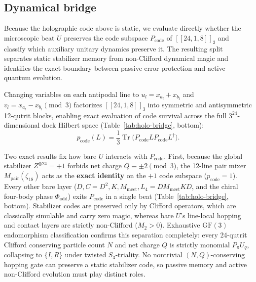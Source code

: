 \subsection{Dynamical bridge}
\label{sec:holo-bridge}

Because the holographic code above is static, we evaluate directly whether the microscopic beat $U$ preserves the code
subspace $P_{\mathrm{code}}$ of $[[24, 1, 8]]_3$ and classify which auxiliary unitary dynamics preserve it. The resulting
split separates static stabilizer memory from non-Clifford dynamical magic and identifies the exact boundary between
passive error protection and active quantum evolution.

Changing variables on each antipodal line to $u_l = x_{a_l} + x_{b_l}$ and $v_l = x_{a_l} - x_{b_l} \pmod 3$ factorizes
$[[24, 1, 8]]_3$ into symmetric and antisymmetric 12-qutrit blocks, enabling exact evaluation of code survival across the
full $3^{24}$-dimensional dock Hilbert space (Table~\ref{tab:holo-bridge}, bottom):
\begin{equation}
p_{\mathrm{code}}(L) = \frac{1}{3}\operatorname{Tr}\bigl(P_{\mathrm{code}} L P_{\mathrm{code}} L^\dagger\bigr).
\label{eq:pcode}
\end{equation}

Two exact results fix how bare $U$ interacts with $P_{\mathrm{code}}$. First, because the global stabilizer
$Z^{\otimes 24} = +1$ forbids net charge $Q \equiv \pm 2 \pmod 3$, the 12-line pair mixer $M_{\mathrm{pair}}(\zeta_{18})$
acts as the \textbf{exact identity} on the $+1$ code subspace ($p_{\mathrm{code}} = 1$). Every other bare layer
($D, C = D^2, K, M_{\mathrm{meet}}, L_4 = D M_{\mathrm{meet}} K D$, and the chiral four-body phase $\Phi_{\mathrm{odd}}$)
exits $P_{\mathrm{code}}$ in a single beat (Table~\ref{tab:holo-bridge}, bottom). Stabilizer codes are preserved only by
Clifford operators, which are classically simulable and carry zero magic, whereas bare $U$'s line-local hopping and
contact layers are strictly non-Clifford ($M_2 > 0$). Exhaustive $\mathrm{GF}(3)$ endomorphism classification confirms
this separation completely: every
24-qutrit Clifford conserving particle count $N$ and net charge $Q$ is strictly monomial $P_\pi U_q$, collapsing to
$\{I, R\}$ under twisted $S_3$-triality. No nontrivial $(N, Q)$-conserving hopping gate can preserve a static stabilizer
code, so passive memory and active non-Clifford evolution must play distinct roles.

